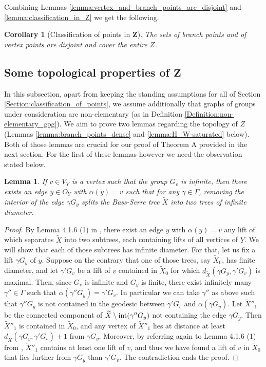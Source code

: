 \documentclass[12pt, a4paper]{article}
\newcommand{\8}{\infty}
\theoremstyle{break}
\newtheorem{lm}[thm]{Lemma}
\newtheorem{cor}[thm]{Corollary}
\theoremstyle{defbreak}
\newcommand{\wtl}[1]{\widetilde{#1}}
\begin{document}
Combining Lemmas \ref{lemma:vertex_and_branch_points_are_disjoint} and \ref{lemma:classification_in_Z} we get the following.\medskip

\begin{cor}[Classification of points in $\mathbf{Z}$]\label{cor}
    The sets of branch points and of vertex points are disjoint and cover the entire $Z$.
\end{cor}




\subsection{Some topological properties of \texorpdfstring{$\mathbf{Z}$}{Z}}\label{properties_of_points_in_Z}

In this subsection, apart from keeping the standing assumptions for all of Section \ref{Section:classification_of_points}, we assume additionally that graphs of groups under consideration are non-elementary (as in Definition \ref{Definition:non-elementary_gog}). We aim to prove two lemmas regarding the topology of $Z$ (Lemmas \ref{lemma:branch_points_dense} and \ref{lemma:H_W-saturated} below). Both of those lemmas are crucial for our proof of Theorem A provided in the next section. For the first of these lemmas however we need the observation stated below.\medskip

\begin{lm}
    If $v\in V_Y$ is a vertex such that the group $G_v$ is infinite, then there exists an edge $y\in O_Y$ with $\alpha(y)=v$ such that for any $\gamma\in \Gamma$, removing the interior of the edge $\gamma G_y$ splits the Bass-Serre tree $\wtl{X}$ into two trees of infinite diameter.
\end{lm}

\begin{proof}
    By Lemma 4.1.6 (1) in \cite{dense-amalgam}, there exist an edge $y$ with $\alpha(y)=v$ any lift of which separates $\wtl{X}$ into two subtrees, each containing lifts of all vertices of $Y$. We will show that each of those subtrees has infinite diameter. For that, let us fix a lift $\gamma G_y$ of $y$. Suppose on the contrary that one of those trees, say $\wtl{X}_0$, has finite diameter, and let $\gamma'G_v$ be a lift of $v$ contained in $\wtl{X}_0$ for which $d_{\wtl{X}}(\gamma G_y, \gamma'G_v)$ is maximal. Then, since $G_v$ is infinite and $G_y$ is finite, there exist infinitely many $\gamma''\in\Gamma$ such that $\alpha(\gamma''G_y) = \gamma'G_v$. In particular we can take $\gamma''$ as above
    such that $\gamma''G_y$ is not contained in the geodesic between $\gamma'G_v$ and $\alpha(\gamma G_y)$. 
    Let $\wtl{X}''_1$ be the connected component of 
    $\wtl{X}\setminus \hbox{int}(\gamma''G_y)$ not containing
    the edge $\gamma G_y$.
    Then $\wtl{X}''_1$ is contained in $\wtl{X}_0$, and any vertex of  $\wtl{X}''_1$ lies at distance at least $d_{\wtl{X}}(\gamma G_y,\gamma'G_v) + 1$ from $\gamma G_y$. Moreover, by referring again to Lemma 4.1.6 (1) from \cite{dense-amalgam}, $\wtl{X}''_1$ contains at least one lift of $v$, and thus we have found a lift of $v$ in $\wtl{X}_0$ that lies further from $\gamma G_y$ than $\gamma'G_v$. The contradiction ends the proof.
\end{proof}
\end{document}
